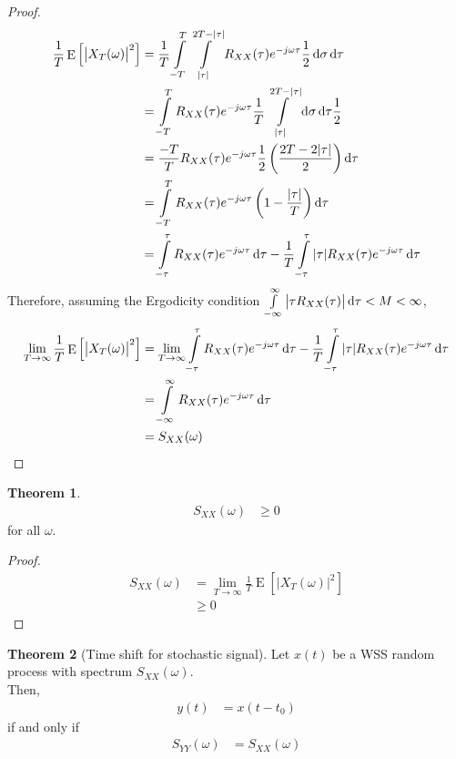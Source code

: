 \documentclass[titlepage, fleqn, a4paper, 12pt, twoside]{article}
\theoremstyle{definition}
\theoremstyle{theorem}
\newtheorem{theorem}{Theorem}
\DeclareMathOperator{\expct}{\mathrm{E}}
\begin{document}
\begin{proof}
	\begin{align*}
		\frac{1}{T} \expct\left[ \left| X_T(\omega) \right|^2 \right] &= \frac{1}{T} \int\limits_{-T}^{T} \int\limits_{|\tau|}^{2 T - |\tau|} R_{X X}(\tau) e^{-j \omega \tau} \frac{1}{2} \dif \sigma \dif \tau\\
		&= \int\limits_{-T}^{T} R_{X X}(\tau) e^{-j \omega \tau} \frac{1}{T} \int\limits_{|\tau|}^{2 T - |\tau|} \dif \sigma \dif \tau \frac{1}{2}\\
		&= \frac{-T}{T} R_{X X}(\tau) e^{-j \omega \tau} \frac{1}{2} \left( \frac{2 T - 2 |\tau|}{2} \right) \dif \tau\\
		&= \int\limits_{-T}^{T} R_{X X}(\tau) e^{-j \omega \tau} \left( 1 - \frac{|\tau|}{T} \right) \dif \tau\\
		&= \int\limits_{-\tau}^{\tau} R_{X X}(\tau) e^{-j \omega \tau} \dif \tau - \frac{1}{T} \int\limits_{-\tau}^{\tau} |\tau| R_{X X}(\tau) e^{-j \omega \tau} \dif \tau
	\end{align*}
	Therefore, assuming the Ergodicity condition $\int\limits_{-\infty}^{\infty} \left| \tau R_{X X}(\tau) \right| \dif \tau < M < \infty$,
	\begin{align*}
		\lim\limits_{T \to \infty} \frac{1}{T} \expct\left[ \left| X_T(\omega) \right|^2 \right] &= \lim\limits_{T \to \infty} \int\limits_{-\tau}^{\tau} R_{X X}(\tau) e^{-j \omega \tau} \dif \tau - \frac{1}{T} \int\limits_{-\tau}^{\tau} |\tau| R_{X X}(\tau) e^{-j \omega \tau} \dif \tau\\
		&= \int\limits_{-\infty}^{\infty} R_{X X}(\tau) e^{-j \omega \tau} \dif \tau\\
		&= S_{X X}(\omega)
	\end{align*}
\end{proof}

\begin{theorem}
	\begin{align*}
		S_{X X}(\omega) &\ge 0
	\end{align*}
	for all $\omega$.
	\label{thm:non_negativity_of_spectrum}
\end{theorem}

\begin{proof}
	\begin{align*}
		S_{X X}(\omega) &= \lim\limits_{T \to \infty} \frac{1}{T} \expct\left[ \left| X_T(\omega) \right|^2 \right]\\
		&\ge 0
	\end{align*}
\end{proof}

\begin{theorem}[Time shift for stochastic signal]
	Let $x(t)$ be a WSS random process with spectrum $S_{X X}(\omega)$.\\
	Then,
	\begin{align*}
		y(t) &= x(t - t_0)
	\end{align*}
	if and only if
	\begin{align*}
		S_{Y Y}(\omega) &= S_{X X}(\omega)
	\end{align*}
	\label{thm:time_shift_for_stochastic_signal}
\end{theorem}
\end{document}
